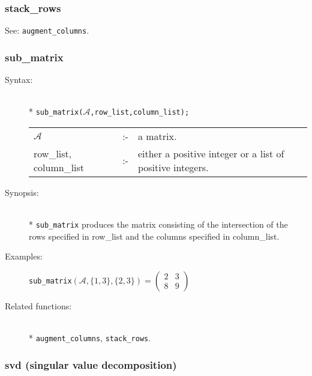 \subsubsection{stack\_rows}
\label{linalg:stack_rows}
\hypertarget{operator:STACK_ROWS}{}

See: \texttt{augment\_columns}.


\subsubsection{sub\_matrix}
\label{linalg:sub_matrix}
\hypertarget{operator:SUB_MATRIX}{}

\begin{description}
\item[Syntax:]\mbox{}\\*
\texttt{sub\_matrix($\mathcal{A}$,row\_list,column\_list);}\\[2mm]
\begin{tabular}{l l p{.605\linewidth}}
$\mathcal{A}$              &:-& a matrix. \\
row\_list, column\_list &:-& either a
positive integer or a list of positive integers.
\end{tabular}

\item[Synopsis:]\mbox{}\\*
\texttt{sub\_matrix} produces the matrix consisting of the
              intersection of the rows specified in row\_list and the
columns specified in column\_list.

\item[Examples:]
\begin{flushleft}
\texttt{sub\_matrix}\((\mathcal{A},\{1,3\},\{2,3\}) =
        \begin{pmatrix} 2 & 3 \\ 8 & 9 \end{pmatrix}\)
\end{flushleft}

\item[Related functions:]\mbox{}\\*
\texttt{augment\_columns}, \texttt{stack\_rows}.
\end{description}


\subsubsection{svd (singular value decomposition)}
\label{linalg:svd}
\hypertarget{operator:SVD}{}

